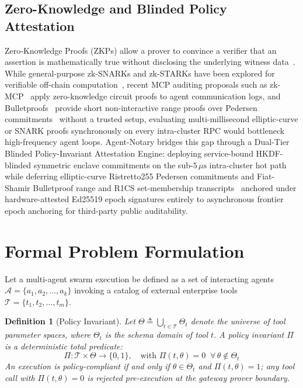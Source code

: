 \documentclass[conference,10pt]{IEEEtran}
\newtheorem{definition}{Definition}
\begin{document}
\subsection{Zero-Knowledge and Blinded Policy Attestation}
Zero-Knowledge Proofs (ZKPs) allow a prover to convince a verifier that an assertion is mathematically true without disclosing the underlying witness data~\cite{goldwasser1989knowledge, ben2018scalable}. While general-purpose zk-SNARKs and zk-STARKs have been explored for verifiable off-chain computation~\cite{sasson2014zerocash}, recent MCP auditing proposals such as zk-MCP~\cite{jing2025zkmcp} apply zero-knowledge circuit proofs to agent communication logs, and Bulletproofs~\cite{bunz2018bulletproofs} provide short non-interactive range proofs over Pedersen commitments~\cite{pedersen1991non} without a trusted setup, evaluating multi-millisecond elliptic-curve or SNARK proofs synchronously on every intra-cluster RPC would bottleneck high-frequency agent loops. Agent-Notary bridges this gap through a Dual-Tier Blinded Policy-Invariant Attestation Engine: deploying service-bound HKDF-blinded symmetric enclave commitments on the sub-$5\,\mu\text{s}$ intra-cluster hot path while deferring elliptic-curve Ristretto255 Pedersen commitments and Fiat-Shamir Bulletproof range and R1CS set-membership transcripts~\cite{fiat1986how, bunz2018bulletproofs} anchored under hardware-attested Ed25519 epoch signatures entirely to asynchronous frontier epoch anchoring for third-party public auditability.

\section{Formal Problem Formulation}
Let a multi-agent swarm execution be defined as a set of interacting agents $\mathcal{A} = \{a_1, a_2, \dots, a_k\}$ invoking a catalog of external enterprise tools $\mathcal{T} = \{t_1, t_2, \dots, t_m\}$.

\begin{definition}[Policy Invariant]
Let $\Theta \triangleq \bigcup_{t \in \mathcal{T}} \Theta_t$ denote the universe of tool parameter spaces, where $\Theta_t$ is the schema domain of tool $t$. A policy invariant $\Pi$ is a deterministic total predicate:
\begin{equation}
\Pi: \mathcal{T} \times \Theta \to \{0, 1\}, \quad \text{with } \Pi(t, \theta) = 0 \;\;\forall\,\theta \notin \Theta_t
\end{equation}
An execution is policy-compliant if and only if $\theta \in \Theta_t$ and $\Pi(t, \theta) = 1$; any tool call with $\Pi(t, \theta) = 0$ is rejected pre-execution at the gateway prover boundary.
\end{definition}
\end{document}
